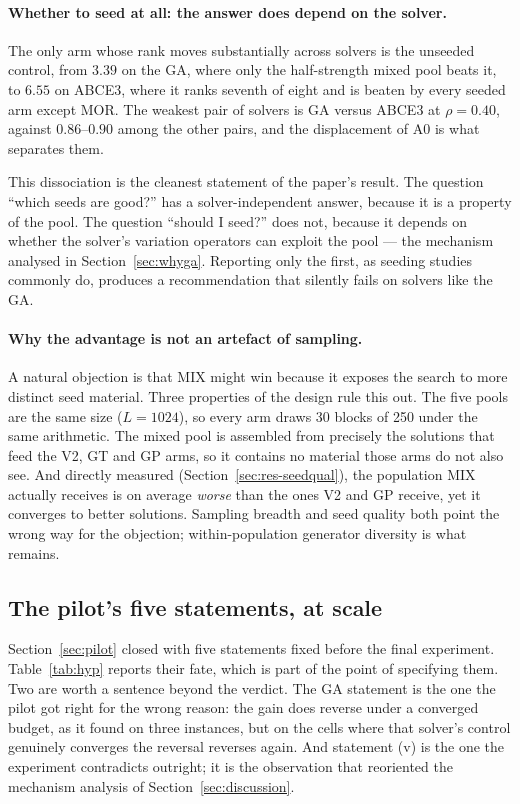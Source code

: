 \documentclass[review]{elsarticle}
\begin{document}
\paragraph{Whether to seed at all: the answer does depend on the solver.}
The only arm whose rank moves substantially across solvers is the unseeded
control, from $3.39$ on the GA, where only the half-strength mixed pool
beats it, to $6.55$ on ABCE3, where it ranks seventh of eight and is beaten
by every seeded arm except MOR. The weakest pair of solvers is GA versus
ABCE3 at $\rho=0.40$, against $0.86$--$0.90$ among the other pairs, and the
displacement of A0 is what separates them.

This dissociation is the cleanest statement of the paper's result. The
question ``which seeds are good?'' has a solver-independent answer, because
it is a property of the pool. The question ``should I seed?'' does not,
because it depends on whether the solver's variation operators can exploit
the pool --- the mechanism analysed in Section~\ref{sec:whyga}. Reporting
only the first, as seeding studies commonly do, produces a recommendation
that silently fails on solvers like the GA.

\paragraph{Why the advantage is not an artefact of sampling.} A natural
objection is that MIX might win because it exposes the search to more
distinct seed material. Three properties of the design rule this out. The
five pools are the same size ($L=1024$), so every arm draws 30 blocks of
250 under the same arithmetic. The mixed pool is assembled from precisely
the solutions that feed the V2, GT and GP arms, so it contains no material
those arms do not also see. And directly measured
(Section~\ref{sec:res-seedqual}), the population MIX actually receives is
on average \emph{worse} than the ones V2 and GP receive, yet it converges
to better solutions. Sampling breadth and seed quality both point the wrong
way for the objection; within-population generator diversity is what
remains.

\subsection{The pilot's five statements, at scale}\label{sec:res-hyp}

Section~\ref{sec:pilot} closed with five statements fixed before the final
experiment. Table~\ref{tab:hyp} reports their fate, which is part of the
point of specifying them. Two are worth a sentence beyond the verdict. The
GA statement is the one the pilot got right for the wrong reason: the gain
does reverse under a converged budget, as it found on three instances, but
on the cells where that solver's control genuinely converges the reversal
reverses again. And statement (v) is the one the experiment contradicts
outright; it is the observation that reoriented the mechanism analysis of
Section~\ref{sec:discussion}.
\end{document}
